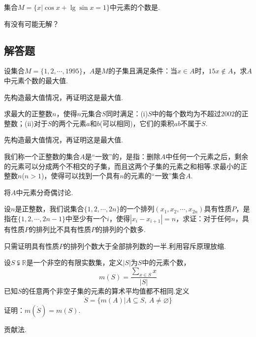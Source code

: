 \documentclass[lang=cn, zihao=4.5]{elegantbook}
\newcommand{\tk}{\uline{\hspace{4em}}}
\begin{document}
\begin{example} %
	集合$M= \{ x|\cos{x} + \lg \sin{x} = 1 \}$中元素的个数是\tk .
\end{example}
\begin{hint}
	有没有可能无解？
\end{hint}

\subsection*{解答题}

\begin{example} %
	设集合$M = \{ 1,2, \cdots ,1995 \}$，$A$是$M$的子集且满足条件：当$x \in A$时，$15x \notin A$，求$A$中元素个数的最大值.
\end{example}
\begin{hint}
	先构造最大值情况，再证明这是最大值.
\end{hint}

\begin{example} %
	求最大的正整数$n$，使得$n$元集合$S$同时满足：(i)$S$中的每个数均为不超过$2002$的正整数；(ii)对于$S$的两个元素$a$和$b$(可以相同)，它们的乘积$ab$不属于$S$.
\end{example}
\begin{hint}
	先构造最大值情况，再证明这是最大值.
\end{hint}

\begin{example} %
	我们称一个正整数的集合$A$是“一致”的，是指：删除$A$中任何一个元素之后，剩余的元素可以分成两个不相交的子集，而且这两个子集的元素之和相等.求最小的正整数$n$($n>1$)，使得可以找到一个具有$n$的元素的“一致”集合$A$.
\end{example}
\begin{hint}
	将$A$中元素分奇偶讨论.
\end{hint}

\begin{example} %
	设$n$是正整数，我们说集合$\{ 1,2, \cdots ,2n \}$的一个排列$(x_1,x_2, \cdots ,x_{2n})$具有性质$P$，是指在$\{ 1,2, \cdots ,2n-1 \}$中至少有一个$i$，使得$|x_i-x_{i+1}|=n$，求证：对于任何$n$，具有性质$P$的排列比不具有性质$P$的排列的个数多.
\end{example}
\begin{hint}
	只需证明具有性质$P$的排列个数大于全部排列数的一半.利用容斥原理放缩.
\end{hint}

\begin{example} %
	设$S \subsetneqq \mathbb{R}$是一个非空的有限实数集，定义$|S|$为$S$中的元素个数，$$m(S) = \frac{\sum_{x \in S} x}{|S|}$$
	已知$S$的任意两个非空子集的元素的算术平均值都不相同.定义$$\dot{S} = \{ m(A) | A \subseteq S, ~A \neq \varnothing \}$$
	证明：$m(\dot{S}) = m(S)$.
\end{example}
\begin{hint}
	贡献法.
\end{hint}
\end{document}
